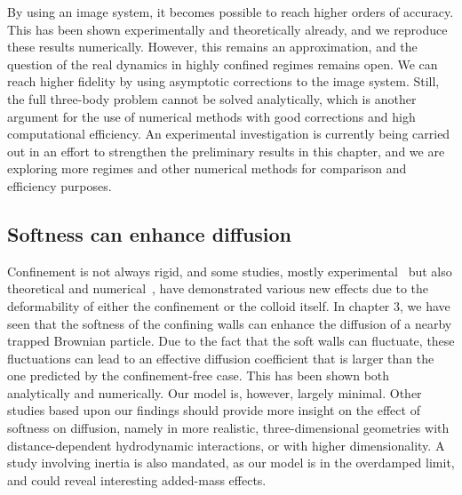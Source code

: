 By using an image system, it becomes possible to reach higher orders of accuracy. This has been shown experimentally and theoretically already, and we reproduce these results numerically. However, this remains an approximation, and the question of the real dynamics in highly confined regimes remains open. We can reach higher fidelity by using asymptotic corrections to the image system. Still, the full three-body problem cannot be solved analytically, which is another argument for the use of numerical methods with good corrections and high computational efficiency. An experimental investigation is currently being carried out in an effort to strengthen the preliminary results in this chapter, and we are exploring more regimes and other numerical methods for comparison and efficiency purposes. 



\subsection*{Softness can enhance diffusion}
Confinement is not always rigid, and some studies, mostly experimental~\cite{fares_observation_2024} but also theoretical and numerical~\cite{ye_brownian_2025}, have demonstrated various new effects due to the deformability of either the confinement or the colloid itself. In chapter 3, we have seen that the softness of the confining walls can enhance the diffusion of a nearby trapped Brownian particle. Due to the fact that the soft walls can fluctuate, these fluctuations can lead to an effective diffusion coefficient that is larger than the one predicted by the confinement-free case. This has been shown both analytically and numerically. Our model is, however, largely minimal. Other studies based upon our findings should provide more insight on the effect of softness on diffusion, namely in more realistic, three-dimensional geometries with distance-dependent hydrodynamic interactions, or with higher dimensionality. A study involving inertia is also mandated, as our model is in the overdamped limit, and could reveal interesting added-mass effects. 



